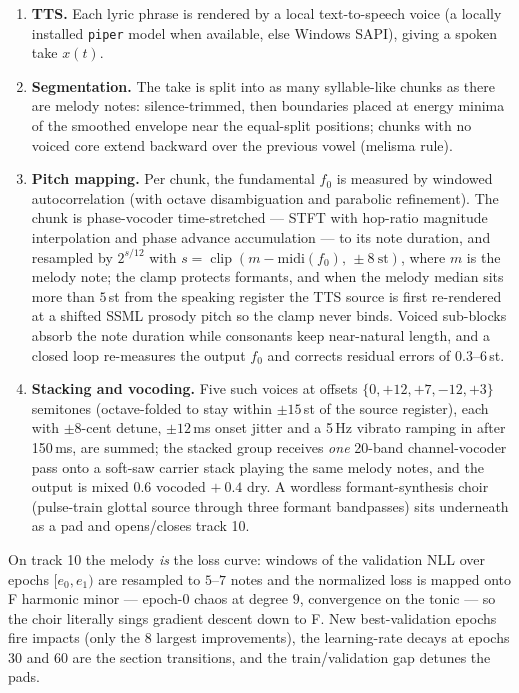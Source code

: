 \documentclass[11pt,a4paper]{article}
\begin{document}
\begin{enumerate}
\item \textbf{TTS.} Each lyric phrase is rendered by a local
  text-to-speech voice (a locally installed \texttt{piper} model when
  available, else Windows SAPI), giving a spoken take $x(t)$.
\item \textbf{Segmentation.} The take is split into as many syllable-like
  chunks as there are melody notes: silence-trimmed, then boundaries placed
  at energy minima of the smoothed envelope near the equal-split positions;
  chunks with no voiced core extend backward over the previous vowel
  (melisma rule).
\item \textbf{Pitch mapping.} Per chunk, the fundamental $f_0$ is measured
  by windowed autocorrelation (with octave disambiguation and parabolic
  refinement). The chunk is phase-vocoder time-stretched --- STFT with
  hop-ratio magnitude interpolation and phase advance accumulation --- to
  its note duration, and resampled by $2^{s/12}$ with
  $s = \operatorname{clip}(m - \mathrm{midi}(f_0),\, \pm 8\ \mathrm{st})$,
  where $m$ is the melody note; the clamp protects formants, and when the
  melody median sits more than $5$\,st from the speaking register the TTS
  source is first re-rendered at a shifted SSML prosody pitch so the clamp
  never binds. Voiced sub-blocks absorb the note duration while consonants
  keep near-natural length, and a closed loop re-measures the output $f_0$
  and corrects residual errors of $0.3$--$6$\,st.
\item \textbf{Stacking and vocoding.} Five such voices at offsets
  $\{0, +12, +7, -12, +3\}$ semitones (octave-folded to stay within
  $\pm 15$\,st of the source register), each with $\pm 8$-cent detune,
  $\pm 12$\,ms onset jitter and a 5\,Hz vibrato ramping in after 150\,ms,
  are summed; the stacked group receives \emph{one} 20-band channel-vocoder
  pass onto a soft-saw carrier stack playing the same melody notes, and the
  output is mixed $0.6$ vocoded $+\ 0.4$ dry. A wordless formant-synthesis
  choir (pulse-train glottal source through three formant bandpasses) sits
  underneath as a pad and opens/closes track 10.
\end{enumerate}

On track 10 the melody \emph{is} the loss curve: windows of the validation
NLL over epochs $[e_0, e_1)$ are resampled to $5$--$7$ notes and the
normalized loss is mapped onto F harmonic minor --- epoch-0 chaos at degree
$9$, convergence on the tonic --- so the choir literally sings gradient
descent down to F. New best-validation epochs fire impacts (only the $8$
largest improvements), the learning-rate decays at epochs 30 and 60 are the
section transitions, and the train/validation gap detunes the pads.
\end{document}
